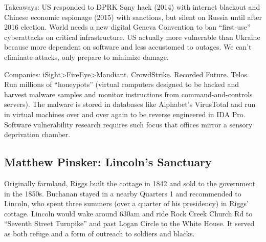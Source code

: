\documentclass[
]{article}
\begin{document}
Takeaways: US responded to DPRK Sony hack (2014) with internet blackout
and Chinese economic espionage (2015) with sanctions, but silent on
Russia until after 2016 election. World needs a new digital Geneva
Convention to ban ``first-use'' cyberattacks on critical infrastructure.
US actually more vulnerable than Ukraine because more dependent on
software and less accustomed to outages. We can't eliminate attacks,
only prepare to minimize damage.

Companies: iSight\textgreater FireEye\textgreater Mandiant. CrowdStrike.
Recorded Future. Telos. Run millions of ``honeypots'' (virtual computers
designed to be hacked and harvest malware samples and monitor
instructions from command-and-controls servers). The malware is stored
in databases like Alphabet's VirusTotal and run in virtual machines over
and over again to be reverse engineered in IDA Pro. Software
vulnerability research requires such focus that offices mirror a sensory
deprivation chamber.

\hypertarget{matthew-pinsker-lincolns-sanctuary}{%
\subsection{Matthew Pinsker: Lincoln's
Sanctuary}\label{matthew-pinsker-lincolns-sanctuary}}

Originally farmland, Riggs built the cottage in 1842 and sold to the
government in the 1850s. Buchanan stayed in a nearby Quarters 1 and
recommended to Lincoln, who spent three summers (over a quarter of his
presidency) in Riggs' cottage. Lincoln would wake around 630am and ride
Rock Creek Church Rd to ``Seventh Street Turnpike'' and past Logan
Circle to the White House. It served as both refuge and a form of
outreach to soldiers and blacks.
\end{document}
